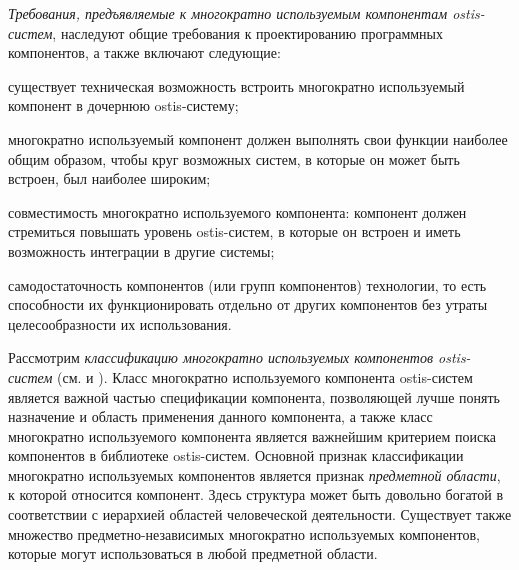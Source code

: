 \textit{Требования, предъявляемые к многократно используемым компонентам ostis-систем}, наследуют общие требования к проектированию программных компонентов, а также включают следующие:
\begin{textitemize}
	\item существует техническая возможность встроить многократно используемый компонент в дочернюю ostis-систему;
	\item многократно используемый компонент должен выполнять свои функции наиболее общим образом, чтобы круг возможных систем, в которые он может быть встроен, был наиболее широким;
	\item совместимость многократно используемого компонента: компонент должен стремиться повышать уровень  ostis-систем, в которые он встроен и иметь возможность  интеграции в другие системы;
	\item самодостаточность компонентов (или групп компонентов) технологии, то есть способности их функционировать отдельно от других компонентов без утраты целесообразности их использования.
\end{textitemize}

Рассмотрим \textit{классификацию многократно используемых компонентов ostis-систем} (см.  и ). Класс многократно используемого компонента ostis-систем является важной частью спецификации компонента, позволяющей лучше понять назначение и область применения данного компонента, а также класс многократно используемого компонента является важнейшим критерием поиска компонентов в библиотеке ostis-систем. Основной признак классификации многократно используемых компонентов является признак \textit{предметной области}, к которой относится компонент. Здесь структура может быть довольно богатой в соответствии с иерархией областей человеческой деятельности. Существует также множество предметно-независимых многократно используемых компонентов, которые могут использоваться в любой предметной области.

